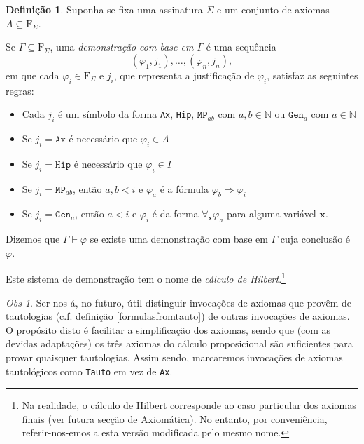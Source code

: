 \documentclass{report}
\theoremstyle{definition}
\newtheorem{definicao}{Definição}
\theoremstyle{remark}
\newtheorem{obs}{Obs}
\newcommand{\N}{\mathbb{N}}
\renewcommand{\bf}[1]{\mathbf{#1}}
\newcommand{\F}{\mathrm{F}}
\newcommand{\imply}{\mathbin{\Rightarrow}}
\begin{document}
	\begin{definicao}
	Suponha-se fixa uma assinatura $\Sigma$ e um conjunto de axiomas $A \subseteq \F_\Sigma$.
	
	Se $\Gamma \subseteq \F_\Sigma$, uma \emph{demonstração com base em $\Gamma$} é uma sequência
	\[(\varphi_1, j_1), \dots, (\varphi_n, j_n),\]
	em que cada $\varphi_i \in \F_\Sigma$ e $j_i$, que representa a justificação de $\varphi_i$, satisfaz as seguintes regras:
	
	\begin{itemize}
	\item Cada $j_i$ é um símbolo da forma \texttt{Ax}, \texttt{Hip}, $\texttt{MP}_{ab}$ com $a, b \in \N$ ou $\texttt{Gen}_a$ com $a \in \N$
	
	\item Se $j_i = \texttt{Ax}$ é necessário que $\varphi_i \in A$
	
	\item Se $j_i = \texttt{Hip}$ é necessário que $\varphi_i \in \Gamma$
	
	\item Se $j_i = \texttt{MP}_{ab}$, então $a, b < i$ e $\varphi_a$ é a fórmula $\varphi_b \imply \varphi_i$
	
	\item Se $j_i = \texttt{Gen}_a$, então $a < i$ e $\varphi_i$ é da forma $\forall_{\bf x} \varphi_a$ para alguma variável $\bf x$.
	\end{itemize}
	
	Dizemos que $\Gamma \vdash \varphi$ se existe uma demonstração com base em $\Gamma$ cuja conclusão é $\varphi$.
	
	Este sistema de demonstração tem o nome de \emph{cálculo de Hilbert}.\footnote{Na realidade, o cálculo de Hilbert corresponde ao caso particular dos axiomas finais (ver futura secção de Axiomática). No entanto, por conveniência, referir-nos-emos a esta versão modificada pelo mesmo nome.}
	\end{definicao}

	\begin{obs}
	Ser-nos-á, no futuro, útil distinguir invocações de axiomas que provêm de tautologias (c.f. definição \ref{formulasfromtauto}) de outras invocações de axiomas. O propósito disto é facilitar a simplificação dos axiomas, sendo que (com as devidas adaptações) os três axiomas do cálculo proposicional são suficientes para provar quaisquer tautologias. Assim sendo, marcaremos invocações de axiomas tautológicos como \texttt{Tauto} em vez de \texttt{Ax}.
	\end{obs}
	
\end{document}

